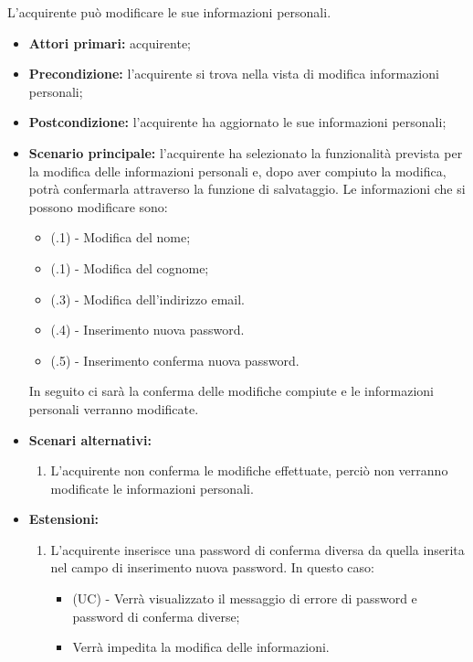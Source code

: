 
L'acquirente può modificare le sue informazioni personali.
\begin{itemize}
    \item \textbf{Attori primari:} acquirente;
    \item \textbf{Precondizione:} l'acquirente si trova nella vista di modifica informazioni personali;
    \item \textbf{Postcondizione:} l'acquirente ha aggiornato le sue informazioni personali;
    \item \textbf{Scenario principale:} l'acquirente ha selezionato la funzionalità prevista per la modifica delle informazioni personali e, dopo aver compiuto la modifica, potrà confermarla attraverso la funzione di salvataggio. Le informazioni che si possono modificare sono:
    \begin{itemize}
        \item (\actualUC.1) - Modifica del nome;
        \item (\actualUC.1) - Modifica del cognome;
        \item (\actualUC.3) - Modifica dell'indirizzo email.
        \item (\actualUC.4) - Inserimento nuova password.
        \item (\actualUC.5) - Inserimento conferma nuova password.
    \end{itemize}
    In seguito ci sarà la conferma delle modifiche compiute e le informazioni personali verranno modificate.
    \item \textbf{Scenari alternativi:}
    \begin{enumerate}[label=\lett]
        \item L'acquirente non conferma le modifiche effettuate, perciò non verranno modificate le informazioni personali.
    \end{enumerate}
    \item \textbf{Estensioni:} 
    \begin{enumerate}[label=\lett] 
        \item L'acquirente inserisce una password di conferma diversa da quella inserita nel campo di inserimento nuova password. In questo caso:
        \begin{itemize}
            \item (UC) - Verrà visualizzato il messaggio di errore di password e password di conferma diverse;
            \item Verrà impedita la modifica delle informazioni.
        \end{itemize}
    \end{enumerate}
\end{itemize}

